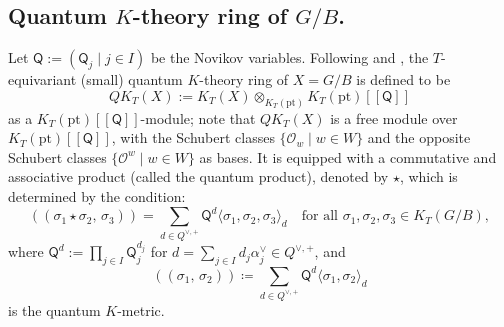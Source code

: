 \documentclass[11pt,a4paper,reqno,dvipdfmx]{amsart}
\numberwithin{equation}{section}
\newcommand{\CO}{\mathcal{O}}
\newcommand{\sQ}{\mathsf{Q}}
\newcommand{\pt}{\mathrm{pt}}
\newcommand{\Kmet}[2]{(\!( #1,\,#2 )\!)}
\newcommand{\bra}[1]{[\![#1]\!]}
\newcommand{\twpx}[2]{ \langle #1, #2 \rangle }
\newcommand{\thpx}[3]{ \langle #1, #2, #3 \rangle }
\theoremstyle{plain}
\theoremstyle{definition}
\theoremstyle{remark}
\begin{document}
%
\subsection{Quantum $K$-theory ring of $G/B$.}
\label{subsec:QKGB}

Let $\sQ := (\sQ_j \mid j \in I)$ be 
the Novikov variables. Following \cite{Giv} and \cite{Lee}, 
the $T$-equivariant (small) quantum $K$-theory ring of $X=G/B$ is defined to be 
%
\begin{equation*} %
QK_T(X) := K_T(X) \otimes_{K_T(\pt)} K_T(\pt)\bra{\sQ}
\end{equation*}
%
as a $K_T(\pt)\bra{\sQ}$-module; note that 
$QK_{T}(X)$ is a free module over $K_T(\pt)\bra{\sQ}$, 
with the Schubert classes $\bigl\{ \CO_{w} \mid w \in W \bigr\}$ and  
the opposite Schubert classes $\bigl\{ \CO^{w} \mid w \in W \bigr\}$ as bases.
%
It is equipped with a commutative and associative 
product (called the quantum product), denoted by $\star$, which is determined by the condition: 
%
%
\begin{equation} \label{eq:qmulti}
\Kmet{\sigma_1 \star \sigma_2}{\sigma_3}=
 \sum_{ d \in Q^{\vee,+} }
 \sQ^d \thpx{\sigma_1}{\sigma_2}{\sigma_3}_{d} \quad 
 \text{for all  } \sigma_1,\sigma_2,\sigma_3\in K_T(G/B), 
\end{equation}
%
where $\sQ^d := \prod_{j \in I} \sQ_j^{d_j}$ 
for $d = \sum_{j \in I} d_j \alpha_j^{\vee} \in Q^{\vee,+}$, and 
%
\begin{equation*}
\Kmet{\sigma_1}{\sigma_2} \coloneqq 
\sum_{d \in Q^{\vee,+}} \sQ^d \twpx{\sigma_1}{\sigma_2}_{d}
\end{equation*}
%
is the quantum $K$-metric. 
\end{document}
